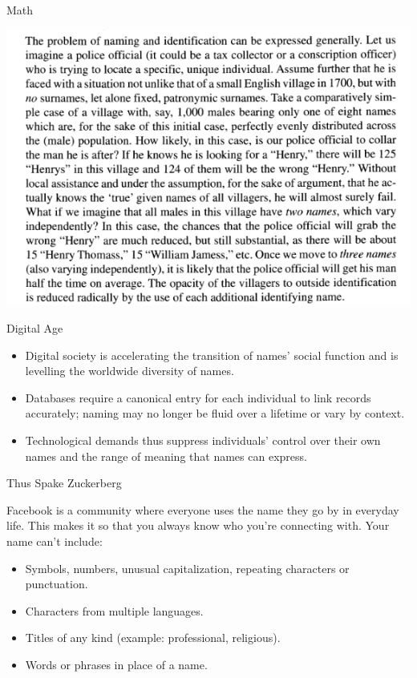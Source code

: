 \documentclass{beamer}
\begin{document}
\begin{frame}{Math}
\begin{center}
\includegraphics[scale=0.4]{subtex/scott9.png}
\end{center}
\end{frame}

\begin{frame}{Digital Age}
\begin{itemize}
\item Digital society is accelerating the transition of names' social function
and is levelling the worldwide diversity of names.
\item Databases require a canonical entry for each individual to link records
accurately; naming may no longer be fluid over a lifetime or vary by context.
\item Technological demands thus suppress individuals' control over their own
names and the range of meaning that names can express. 
\end{itemize}
\end{frame}

\begin{frame}{Thus Spake Zuckerberg}
\begin{aquote}{\textcite{what-names-fb}}
Facebook is a community where everyone uses the name they go by in everyday
life. This makes it so that you always know who you're connecting with. Your
name can't include:
\begin{itemize}
\item Symbols, numbers, unusual capitalization, repeating characters or punctuation.
\item Characters from multiple languages.
\item Titles of any kind (example: professional, religious).
\item Words or phrases in place of a name.
\end{itemize}
\end{aquote}
\end{frame}
\end{document}
